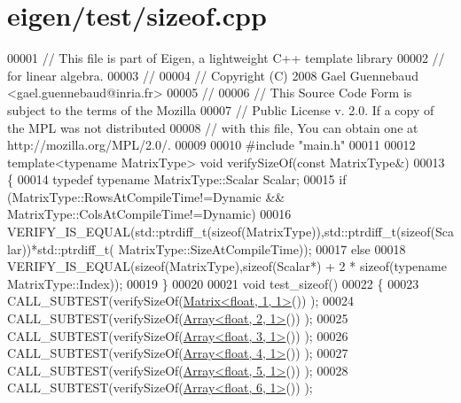 \hypertarget{eigen_2test_2sizeof_8cpp_source}{}\section{eigen/test/sizeof.cpp}
\label{eigen_2test_2sizeof_8cpp_source}

\begin{DoxyCode}
00001 \textcolor{comment}{// This file is part of Eigen, a lightweight C++ template library}
00002 \textcolor{comment}{// for linear algebra.}
00003 \textcolor{comment}{//}
00004 \textcolor{comment}{// Copyright (C) 2008 Gael Guennebaud <gael.guennebaud@inria.fr>}
00005 \textcolor{comment}{//}
00006 \textcolor{comment}{// This Source Code Form is subject to the terms of the Mozilla}
00007 \textcolor{comment}{// Public License v. 2.0. If a copy of the MPL was not distributed}
00008 \textcolor{comment}{// with this file, You can obtain one at http://mozilla.org/MPL/2.0/.}
00009 
00010 \textcolor{preprocessor}{#include "main.h"}
00011 
00012 \textcolor{keyword}{template}<\textcolor{keyword}{typename} MatrixType> \textcolor{keywordtype}{void} verifySizeOf(\textcolor{keyword}{const} MatrixType&)
00013 \{
00014   \textcolor{keyword}{typedef} \textcolor{keyword}{typename} MatrixType::Scalar Scalar;
00015   \textcolor{keywordflow}{if} (MatrixType::RowsAtCompileTime!=Dynamic && MatrixType::ColsAtCompileTime!=Dynamic)
00016     VERIFY\_IS\_EQUAL(std::ptrdiff\_t(\textcolor{keyword}{sizeof}(MatrixType)),std::ptrdiff\_t(\textcolor{keyword}{sizeof}(Scalar))*std::ptrdiff\_t(
      MatrixType::SizeAtCompileTime));
00017   \textcolor{keywordflow}{else}
00018     VERIFY\_IS\_EQUAL(\textcolor{keyword}{sizeof}(MatrixType),\textcolor{keyword}{sizeof}(Scalar*) + 2 * \textcolor{keyword}{sizeof}(\textcolor{keyword}{typename} MatrixType::Index));
00019 \}
00020 
00021 \textcolor{keywordtype}{void} test\_sizeof()
00022 \{
00023   CALL\_SUBTEST(verifySizeOf(\hyperlink{group___core___module_class_eigen_1_1_matrix}{Matrix<float, 1, 1>}()) );
00024   CALL\_SUBTEST(verifySizeOf(\hyperlink{group___core___module_class_eigen_1_1_array}{Array<float, 2, 1>}()) );
00025   CALL\_SUBTEST(verifySizeOf(\hyperlink{group___core___module_class_eigen_1_1_array}{Array<float, 3, 1>}()) );
00026   CALL\_SUBTEST(verifySizeOf(\hyperlink{group___core___module_class_eigen_1_1_array}{Array<float, 4, 1>}()) );
00027   CALL\_SUBTEST(verifySizeOf(\hyperlink{group___core___module_class_eigen_1_1_array}{Array<float, 5, 1>}()) );
00028   CALL\_SUBTEST(verifySizeOf(\hyperlink{group___core___module_class_eigen_1_1_array}{Array<float, 6, 1>}()) );

\end{DoxyCode}
